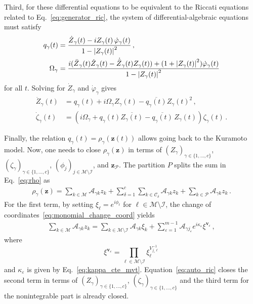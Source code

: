 \documentclass[aps,pre,reprint,longbibliography,superscriptaddress,noshowpacs,floatfix]{revtex4-2}
\theoremstyle{definition}
\theoremstyle{remark}
\newcommand*{\sbar}{\skew{3}{\bar}}
\newcommand*{\sdot}{\skew{3}{\dot}}
\begin{document}
Third, for these differential equations to be equivalent to the Riccati equations related to Eq.~\eqref{eq:generator_ric}, the system of differential-algebraic equations must satisfy
\begin{align*}
    q_{\gamma}(t) &= \frac{\sdot{Z}_{\gamma}(t) - iZ_{\gamma}(t)\,\dot{\varphi}_{\gamma}(t)}{1 - \left|Z_{\gamma}(t)\right|^2}\,, \\
    \Omega_{\gamma} &= \frac{i(\sbar{Z}_{\gamma}(t)\sdot{Z}_{\gamma}(t)-\sdot{\sbar{Z}}_{\gamma}(t)Z_{\gamma}(t)) + (1 + \left|Z_{\gamma}(t)\right|^2)\dot{\varphi}_{\gamma}(t)}{1 - \left|Z_{\gamma}(t)\right|^2}
\end{align*}
for all $t$. Solving for $\dot{Z}_{\gamma}$ and $\dot{\varphi}_{\gamma}$ gives
\begin{align*}
    \dot{Z}_{\gamma}(t) &=  q_{\gamma}(t) + i\Omega_{\gamma} Z_{\gamma}(t)- \overline{q_{\gamma}(t)}Z_{\gamma}(t)^2\,,\\
    \dot{\zeta}_{\gamma}(t) &= (i\Omega_{\gamma} + q_{\gamma}(t)\overline{Z_{\gamma}(t)} - \overline{q_{\gamma}(t)}\,Z_{\gamma}(t))\zeta_{\gamma}(t)\,.
\end{align*}

Finally, the relation $q_{\gamma}(t) = \rho_{\gamma}(\bm{z}(t))$ allows going back to the Kuramoto model.
Now, one needs to close $\rho_{\gamma}(\bm{z})$ in terms of $(Z_{\gamma})_{\gamma\in\{1,...,c\}}$, $(\zeta_{\gamma})_{\gamma\in\{1,...,c\}}$, $(\phi_j)_{j\in\mathcal{M}\setminus\mathcal{I}}$, and  $\bm{z}_{\mathcal{P}}$. The partition $P$ splits the sum in Eq.~\eqref{eq:rho} as
\begin{align*}
    \rho_{\gamma}(\bm{z}) = \sum_{k\in\mathcal{M}} \mathcal{A}_{\gamma k}z_k + \sum_{\delta=1}^c \sum_{k\in \mathcal{C}_\delta} \mathcal{A}_{\gamma k}z_k + \sum_{k\in\mathcal{P}} \mathcal{A}_{\gamma k}z_k\,.
\end{align*}
For the first term, by setting $\xi_\ell = e^{i\phi_\ell}$ for $\ell\in\mathcal{M}\setminus \mathcal{I}$, the change of coordinates~\eqref{eq:monomial_change_coord} yields
\begin{align*}
    \sum_{k\in\mathcal{M}} \mathcal{A}_{\gamma k}z_k = \sum_{k\in\mathcal{M}\setminus\mathcal{I}}\mathcal{A}_{\gamma k}\xi_k + \sum_{\varepsilon = 1}^{m-1} \mathcal{A}_{\gamma j_\varepsilon}e^{i\kappa_\varepsilon}\xi^{\bm{v}_\varepsilon}\,,
\end{align*}
where 
\begin{equation}
    \xi^{\bm{v}_\varepsilon} = \prod_{\ell \in \mathcal{M}\setminus \mathcal{I}}\xi_\ell^{V_{j_\varepsilon \ell}^{-1}}
\end{equation}
and $\kappa_\varepsilon$ is given by Eq.~\eqref{eq:kappa_cte_mvt}. Equation~\eqref{eq:auto_ric} closes the second term in terms of $(Z_{\gamma})_{\gamma\in\{1,...,c\}}$, $(\zeta_{\gamma})_{\gamma\in\{1,...,c\}}$ and the third term for the nonintegrable part is already closed. 
\end{document}

